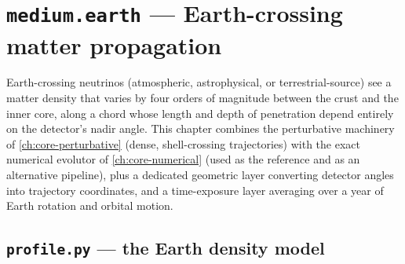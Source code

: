 \chapter{\texttt{medium.earth} --- Earth-crossing matter propagation}
\label{ch:earth}

Earth-crossing neutrinos (atmospheric, astrophysical, or terrestrial-source)
see a matter density that varies by four orders of magnitude between the
crust and the inner core, along a chord whose length and depth of
penetration depend entirely on the detector's nadir angle. This chapter
combines the perturbative machinery of \cref{ch:core-perturbative} (dense,
shell-crossing trajectories) with the exact numerical evolutor of
\cref{ch:core-numerical} (used as the reference and as an alternative
pipeline), plus a dedicated geometric layer converting detector angles into
trajectory coordinates, and a time-exposure layer averaging over a year of
Earth rotation and orbital motion.

\section{\texttt{profile.py} --- the Earth density model}
\label{sec:earth-profile}


